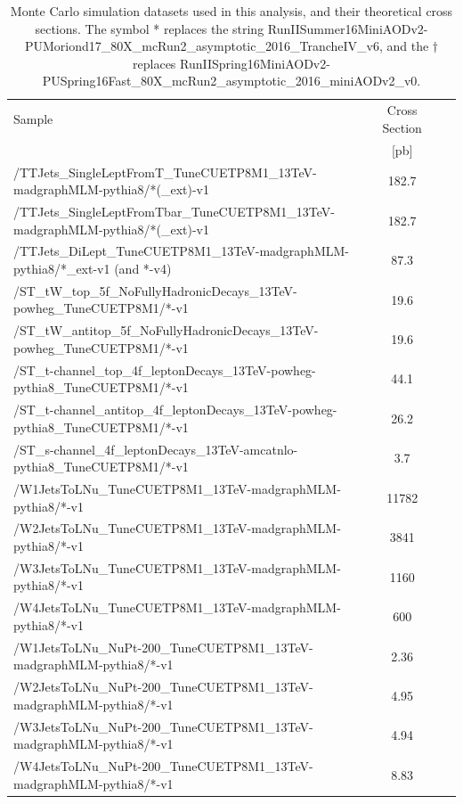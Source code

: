 \begin{table}[htp]
\caption{
  Monte Carlo simulation datasets used in this analysis, and their
  theoretical cross sections. The symbol * replaces the string
  RunIISummer16MiniAODv2-PUMoriond17\_80X\_mcRun2\_asymptotic\_2016\_TrancheIV\_v6, %
  and the $\dagger$ replaces
  RunIISpring16MiniAODv2-PUSpring16Fast\_80X\_mcRun2\_asymptotic\_2016\_miniAODv2\_v0.}
\label{tab:stop:mcsamples}
\centering
{\footnotesize
\begin{tabular}{|l|c|c|c|}
\hline
Sample & Cross Section \\
& [pb] \\
\hline
/TTJets\_SingleLeptFromT\_TuneCUETP8M1\_13TeV-madgraphMLM-pythia8/*(\_ext)-v1 & 182.7 \\
/TTJets\_SingleLeptFromTbar\_TuneCUETP8M1\_13TeV-madgraphMLM-pythia8/*(\_ext)-v1 & 182.7 \\
/TTJets\_DiLept\_TuneCUETP8M1\_13TeV-madgraphMLM-pythia8/*\_ext-v1 (and *-v4) & 87.3 \\
/ST\_tW\_top\_5f\_NoFullyHadronicDecays\_13TeV-powheg\_TuneCUETP8M1/*-v1 & 19.6 \\
/ST\_tW\_antitop\_5f\_NoFullyHadronicDecays\_13TeV-powheg\_TuneCUETP8M1/*-v1 & 19.6 \\
/ST\_t-channel\_top\_4f\_leptonDecays\_13TeV-powheg-pythia8\_TuneCUETP8M1/*-v1 & 44.1 \\ 
/ST\_t-channel\_antitop\_4f\_leptonDecays\_13TeV-powheg-pythia8\_TuneCUETP8M1/*-v1 & 26.2 \\
/ST\_s-channel\_4f\_leptonDecays\_13TeV-amcatnlo-pythia8\_TuneCUETP8M1/*-v1 & 3.7 \\
/W1JetsToLNu\_TuneCUETP8M1\_13TeV-madgraphMLM-pythia8/*-v1 & 11782  \\
/W2JetsToLNu\_TuneCUETP8M1\_13TeV-madgraphMLM-pythia8/*-v1 & 3841 \\
/W3JetsToLNu\_TuneCUETP8M1\_13TeV-madgraphMLM-pythia8/*-v1 & 1160 \\
/W4JetsToLNu\_TuneCUETP8M1\_13TeV-madgraphMLM-pythia8/*-v1 & 600 \\
/W1JetsToLNu\_NuPt-200\_TuneCUETP8M1\_13TeV-madgraphMLM-pythia8/*-v1 & 2.36  \\
/W2JetsToLNu\_NuPt-200\_TuneCUETP8M1\_13TeV-madgraphMLM-pythia8/*-v1 & 4.95 \\
/W3JetsToLNu\_NuPt-200\_TuneCUETP8M1\_13TeV-madgraphMLM-pythia8/*-v1 & 4.94 \\
/W4JetsToLNu\_NuPt-200\_TuneCUETP8M1\_13TeV-madgraphMLM-pythia8/*-v1 & 8.83 \\

\end{tabular}}
\end{table}
